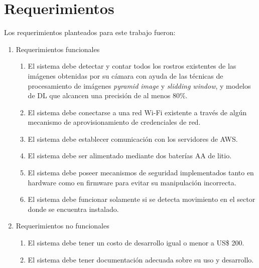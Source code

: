 \section{Requerimientos}
Los requerimientos planteados para este trabajo fueron:
\begin{enumerate}
	\item Requerimientos funcionales
  \begin{enumerate}
     	\item El sistema debe detectar y contar todos los rostros existentes de las imágenes obtenidas por su cámara con ayuda de las técnicas de procesamiento de imágenes \textit{pyramid image} y \textit{slidding window}, y modelos de DL que alcancen una precisión de al menos 80\%.
		\item El sistema debe conectarse a una red Wi-Fi existente a través de algún mecanismo de aprovisionamiento de credenciales de red.
		\item El sistema debe establecer comunicación con los servidores de AWS.
		\item El sistema debe ser alimentado mediante dos baterías AA de litio.
		\item El sistema debe poseer mecanismos de seguridad implementados tanto en hardware como en firmware para evitar su manipulación incorrecta.
		\item El sistema debe funcionar solamente si se detecta movimiento en el sector donde se encuentra instalado.
	\end{enumerate}
	\item Requerimientos no funcionales
	\begin{enumerate}
		\item El sistema debe tener un costo de desarrollo igual o menor a US\$ 200.
		\item El sistema debe tener documentación adecuada sobre su uso y desarrollo.
	\end{enumerate}
\end{enumerate}







